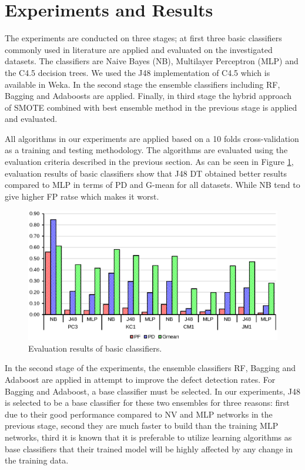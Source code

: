 \documentclass[runningheads,a4paper]{llncs}
\begin{document}
\section{Experiments and Results}
\label{experiments}

The experiments are conducted on three stages; at first three basic classifiers commonly used in literature are applied and evaluated on the investigated datasets. The classifiers are Naive Bayes (NB), Multilayer Perceptron (MLP) and the C4.5 decision trees. We used the J48 implementation of C4.5 which is available in Weka. In the second stage the ensemble classifiers including RF, Bagging and Adaboosts are applied. Finally, in third stage the hybrid approach of SMOTE combined with best ensemble method in the previous stage is applied and evaluated.

All algorithms in our experiments are applied based on a 10 folds cross-validation as a training and testing methodology. The algorithms are evaluated using the evaluation criteria described in the previous section. As can be seen in Figure  \ref{fig:basic}, evaluation results of basic classifiers show that J48 DT obtained better results compared to MLP in terms of PD and G-mean for all datasets. While NB tend to give higher FP ratse which makes it worst. 



\begin{figure}[h]
\label{fig:ss}
\begin{center}
\includegraphics[scale=0.6]{basicresults.eps}
\caption{Evaluation results of basic classifiers.}
\end{center}
\label{fig:basic}
\end{figure}


In the second stage of the experiments, the ensemble classifiers RF, Bagging and Adaboost are applied in attempt to improve the defect detection rates. For Bagging and Adaboost, a base classifier must be selected. In our experiments, J48 is selected to be a base classifier for these two ensembles for three reasons: first due to their good performance compared to NV and MLP networks in the previous stage, second they are much faster to build than the training MLP networks, third it is known that it is preferable to utilize learning algorithms as base classifiers that their trained model will be highly affected by any change in the training data. 
\end{document}
